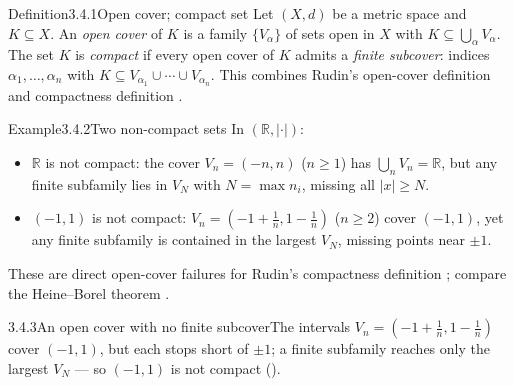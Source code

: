 \documentclass[main.tex]{subfiles}
\begin{document}
\begin{Obj}{Definition}{3.4.1}{Open cover; compact set}
Let $(X,d)$ be a metric space and $K\subseteq X$. An \emph{open cover} of $K$ is a family
$\{V_\alpha\}$ of sets open in $X$ with $K\subseteq\bigcup_\alpha V_\alpha$. The set $K$ is
\emph{compact} if every open cover of $K$ admits a \emph{finite subcover}: indices
$\alpha_1,\dots,\alpha_n$ with $K\subseteq V_{\alpha_1}\cup\cdots\cup V_{\alpha_n}$.
This combines Rudin's open-cover definition  and compactness definition .
\end{Obj}

\begin{ObjL}{Example}{3.4.2}{Two non-compact sets}
In $(\mathbb R,|\cdot|)$:
\begin{itemize}
  \item $\mathbb R$ is not compact: the cover $V_n=(-n,n)$ ($n\ge1$) has $\bigcup_n V_n=\mathbb R$,
    but any finite subfamily lies in $V_N$ with $N=\max n_i$, missing all $|x|\ge N$.
  \item $(-1,1)$ is not compact: $V_n=(-1+\tfrac1n,1-\tfrac1n)$ ($n\ge2$) cover $(-1,1)$, yet any
    finite subfamily is contained in the largest $V_N$, missing points near $\pm1$.
\end{itemize}
These are direct open-cover failures for Rudin's compactness definition ; compare the
Heine--Borel theorem .
\end{ObjL}

\begin{Fig}{3.4.3}{An open cover with no finite subcover}{The intervals $V_n=(-1+\tfrac1n,1-\tfrac1n)$ cover $(-1,1)$, but each stops short of $\pm1$; a finite subfamily reaches only the largest $V_N$ --- so $(-1,1)$ is not compact ().}
\end{Fig}
\end{document}
